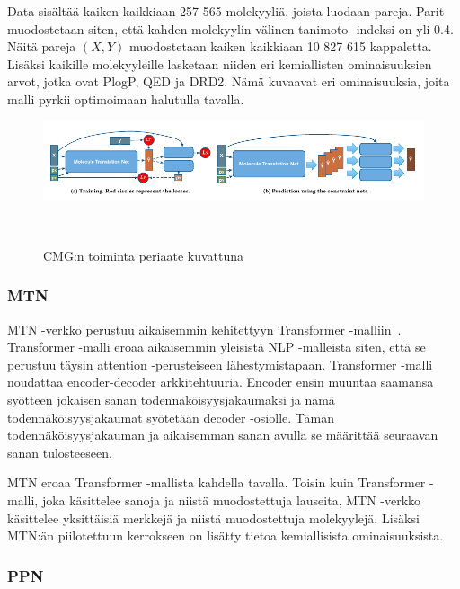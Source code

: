 \documentclass[finnish,twoside,censored,tkt,sw-line]{HYthesisML}
\begin{document}
Data sisältää kaiken kaikkiaan 257 565 molekyyliä, joista luodaan pareja.
Parit muodostetaan siten, että kahden molekyylin välinen tanimoto -indeksi on yli 0.4.
Näitä pareja \((X,Y)\) muodostetaan kaiken kaikkiaan 10 827 615 kappaletta.
Lisäksi kaikille molekyyleille lasketaan niiden eri kemiallisten ominaisuuksien arvot, jotka ovat PlogP, QED ja DRD2.
Nämä kuvaavat eri ominaisuuksia, joita malli pyrkii optimoimaan halutulla tavalla.

\begin{figure}[ht]
    \centering
    \includegraphics[width=\textwidth]{CMG-fig.png}
    \caption{CMG:n toiminta periaate kuvattuna}
    {~\cite{ShinBonggun}}
\end{figure}

\subsubsection{MTN}

MTN -verkko perustuu aikaisemmin kehitettyyn Transformer -malliin~\cite{TheTransformer}.
Transformer -malli eroaa aikaisemmin yleisistä NLP -malleista siten, että se perustuu täysin attention -perusteiseen lähestymistapaan.
Transformer -malli noudattaa encoder-decoder arkkitehtuuria.
Encoder ensin muuntaa saamansa syötteen jokaisen sanan todennäköisyysjakaumaksi ja nämä todennäköisyysjakaumat syötetään decoder -osiolle.
Tämän todennäköisyysjakauman ja aikaisemman sanan avulla se määrittää seuraavan sanan tulosteeseen.

MTN eroaa Transformer -mallista kahdella tavalla.
Toisin kuin Transformer -malli, joka käsittelee sanoja ja niistä muodostettuja lauseita, MTN -verkko käsittelee yksittäisiä merkkejä ja niistä muodostettuja molekyylejä.
Lisäksi MTN:än piilotettuun kerrokseen on lisätty tietoa kemiallisista ominaisuuksista.

\subsubsection{PPN}
\end{document}
